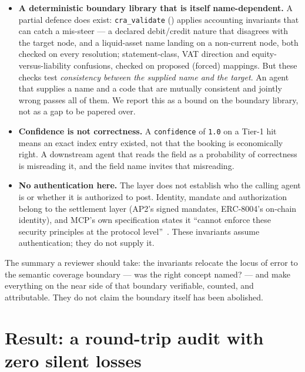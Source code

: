 \documentclass[11pt]{clapps}  %
\begin{document}
\begin{itemize}
  \item \textbf{A deterministic boundary library that is itself
  name-dependent.} A partial defence does exist:
  \texttt{cra\_validate} () applies
  accounting invariants that can catch a mis-steer --- a declared debit/credit
  nature that disagrees with the target node, and a liquid-asset name landing on
  a non-current node, both checked on every resolution; statement-class, VAT
  direction and equity-versus-liability confusions, checked on proposed
  (forced) mappings. But these checks test \emph{consistency between the
  supplied name and the target}. An agent that supplies a name and a code that
  are mutually consistent and jointly wrong passes all of them. We report this
  as a bound on the boundary library, not as a gap to be papered over.

  \item \textbf{Confidence is not correctness.} A \texttt{confidence} of
  \texttt{1.0} on a Tier-1 hit means an exact index entry existed, not that the
  booking is economically right. A downstream agent that reads the field as a
  probability of correctness is misreading it, and the field name invites that
  misreading.

  \item \textbf{No authentication here.} The layer does not establish who the
  calling agent is or whether it is authorized to post. Identity, mandate and
  authorization belong to the settlement layer (AP2's signed mandates,
  ERC-8004's on-chain identity), and MCP's own specification states it ``cannot
  enforce these security principles at the protocol
  level''~\cite{mcp_spec}. These invariants assume authentication; they do not
  supply it.
\end{itemize}

The summary a reviewer should take: the invariants relocate the locus of error
to the semantic coverage boundary --- was the right concept named? --- and make
everything on the near side of that boundary verifiable, counted, and
attributable. They do not claim the boundary itself has been abolished.

\section{Result: a round-trip audit with zero silent losses}
\end{document}
